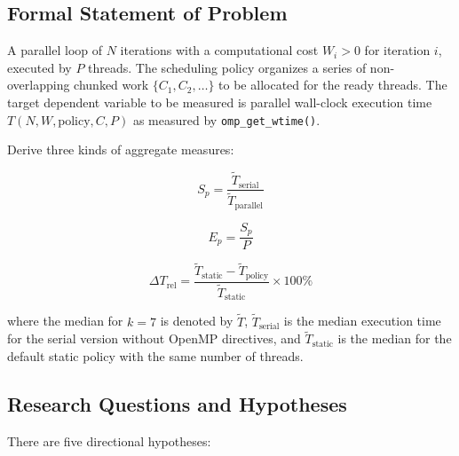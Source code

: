 \documentclass[conference]{IEEEtran}
\begin{document}
\subsection{Formal Statement of Problem}

A parallel loop of \(N\) iterations with a computational cost \(W_i > 0\) for iteration \(i\), executed by \(P\) threads. The scheduling policy organizes a series of non-overlapping chunked work \(\{C_1, C_2, \ldots\}\) to be allocated for the ready threads. The target dependent variable to be measured is parallel wall-clock execution time \(T(N, W, \text{policy}, C, P)\) as measured by \texttt{omp\_get\_wtime()}.

Derive three kinds of aggregate measures:

\begin{equation}
S_p = \frac{\widetilde{T}_{\text{serial}}}
{\widetilde{T}_{\text{parallel}}}
\end{equation}

\begin{equation}
E_p = \frac{S_p}{P}
\end{equation}

\begin{equation}
\Delta T_{\text{rel}} =
\frac{\widetilde{T}_{\text{static}} -
\widetilde{T}_{\text{policy}}}
{\widetilde{T}_{\text{static}}}
\times 100\%
\end{equation}

where the median for \(k=7\) is denoted by \(\widetilde{T}\), \(\widetilde{T}_{\text{serial}}\) is the median execution time for the serial version without OpenMP directives, and \(\widetilde{T}_{\text{static}}\) is the median for the default static policy with the same number of threads.

\subsection{Research Questions and Hypotheses}

There are five directional hypotheses:
\end{document}
